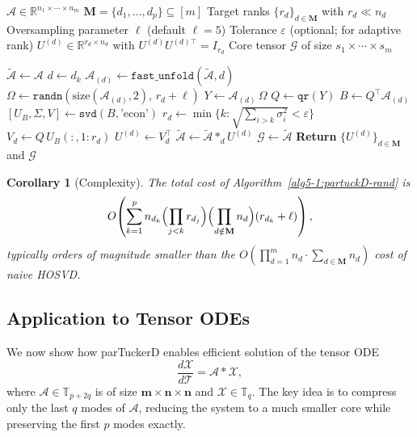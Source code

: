 \documentclass[11pt, oneside]{article}  %
\newtheorem{cor}[thm]{Corollary}
\newcommand{\varp}{\varepsilon}
\newcommand{\RR}{\mathbb{R}}
\newcommand{\TT}{\mathbb{T}}
\newcommand{\A}{\mathcal{A}}
\newcommand{\tA}{\tilde{\A}}
\newcommand{\caG}{\mathcal{G}}
\newcommand{\caM}{\mathbf{M}}
\newcommand{\T}{\mathcal{T}}
\newcommand{\X}{\mathcal{X}}
\newcommand{\bfm}{\textbf{m}}
\newcommand{\bfn}{\textbf{n}}
\newcommand{\beq}{\begin{equation}}
\newcommand{\eeq}{\end{equation}}
\begin{document}
\begin{algorithm}
\caption{Partial Tucker Decomposition (parTuckerD) via Randomized SVD}
\label{alg5-1:partuckD-rand}
\begin{algorithmic}[1]
\Require $\A\in\RR^{n_1 \times \cdots \times n_m}$ 
\Require $\caM = \{d_1,\ldots,d_p\} \subseteq [m]$ 
\Require Target ranks $\{r_d\}_{d\in\caM}$ with $r_d\ll n_d$
\Require Oversampling parameter $\ell$ (default $\ell=5$)
\Require Tolerance $\varp$ (optional; for adaptive rank)
\Ensure $U^{(d)}\in\RR^{r_d\times n_d}$ with $U^{(d)}U^{(d)\top}=I_{r_d}$
\Ensure Core tensor $\caG$ of size $s_1\times\cdots\times s_m$

\State $\tA \gets \A$ 
    \State $d \gets d_k$
    \State $\A_{(d)} \gets \texttt{fast\_unfold}(\tA, d)$ 
    \State $\Omega \gets \texttt{randn}(\text{size}(\A_{(d)},2),\, r_d+\ell)$
    \State $Y \gets \A_{(d)}\,\Omega$ 
    \State $Q \gets \texttt{qr}(Y)$ 
    \State $B \gets Q^\top \A_{(d)}$ 
    \State $[U_B,\Sigma,V] \gets \texttt{svd}(B,\text{'econ'})$
    \If{$\varp$ provided}
        \State $r_d \gets \min\{k:\sqrt{\sum_{i>k}\sigma_i^2}<\varp\}$
    \EndIf
    \State $V_{d} \gets Q\,U_B(:,1:r_d)$
   \State $U^{(d)} \gets V_{d}^{\top}$
    \State $\tA \gets \tA \ast_d U^{(d)}$ 
\EndFor
\State $\caG \gets \tA$
\State \textbf{Return} $\{U^{(d)}\}_{d\in\caM}$ and $\caG$
\end{algorithmic}
\end{algorithm}

\begin{cor}[Complexity]\label{cor:complexity}
The total cost of Algorithm~\ref{alg5-1:partuckD-rand} is
\[
O\!\left( \sum_{k=1}^p n_{d_k} \Bigl(\prod_{j<k} r_{d_j}\Bigr) \Bigl(\prod_{d\notin\caM} n_d\Bigr) (r_{d_k}+\ell) \right),
\]
typically orders of magnitude smaller than the $O(\prod_{d=1}^m n_d \cdot \sum_{d\in\caM} n_d)$ cost of naive HOSVD.
\end{cor}


\subsection{Application to Tensor ODEs}
\label{sec5-4}

We now show how parTuckerD enables efficient solution of the tensor ODE
\beq\label{eq5-4-1:tensorODE}
\frac{d\X}{d\T} = \A \ast \X,
\eeq
where $\A\in\TT_{p+2q}$ is of size $\bfm\times\bfn\times\bfn$ and $\X\in\TT_q$.  The key idea is to compress only the last $q$ modes of $\A$, reducing the system to a much smaller core while preserving the first $p$ modes exactly.
\end{document}
